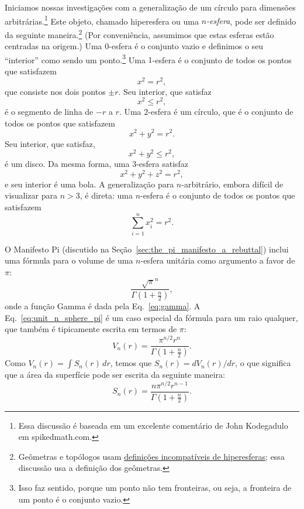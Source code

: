 Iniciamos nossas investigações com a generalização de um círculo para dimensões arbitrárias.\footnote{Essa discussão é baseada em um excelente comentário de John Kodegadulo em spikedmath.com.} Este objeto, chamado hiperesfera ou uma \emph{$n$-esfera}, pode ser definido da seguinte maneira.\footnote{Geômetras e topólogos usam \href{https://mathworld.wolfram.com/Hypersphere.html}{definições incompatíveis de hiperesferas}; essa discussão usa a definição dos geômetras.} (Por conveniência, assumimos que estas esferas estão centradas na origem.) Uma $0$-esfera é o conjunto vazio e definimos o seu ``interior'' como sendo um ponto.\footnote{Isso faz sentido, porque um ponto não tem fronteiras, ou seja, a fronteira de um ponto é o conjunto vazio.} Uma $1$-esfera é o conjunto de todos os pontos que satisfazem
\[
x^2 = r^2,
\]
que consiste nos dois pontos $\pm r$. Seu interior, que satisfaz
\[
x^2 \leq r^2,
\]
é o segmento de linha de $-r$ a $r$. Uma $2$-esfera é um círculo, que é o conjunto de todos os pontos que satisfazem
\[
x^2 + y^2 = r^2.
\]
Seu interior, que satisfaz,
\[
x^2 + y^2 \leq r^2,
\]
é um disco. Da mesma forma, uma $3$-esfera satisfaz
\[
x^2 + y^2 + z^2 = r^2,
\]
e seu interior é uma bola. A generalização para $n$-arbitrário, embora difícil de visualizar para $n > 3$, é direta: uma $n$-esfera é o conjunto de todos os pontos que satisfazem
\[
\sum_{i=1}^{n} x_i^2 = r^2.
\]

O Manifesto Pi (discutido na Seção~\ref{sec:the_pi_manifesto_a_rebuttal}) inclui uma fórmula para o volume de uma $n$-esfera unitária como argumento a favor de $\pi$:
\begin{equation}
\label{eq:unit_n_sphere_pi}
\frac{\sqrt{\pi}^{n} }{\Gamma(1 + \frac{n}{2})},
\end{equation}
onde a função Gamma é dada pela Eq.~\eqref{eq:gamma}. A Eq.~\eqref{eq:unit_n_sphere_pi} é um caso especial da fórmula para um raio qualquer, que também é tipicamente escrita em termos de $\pi$:
\begin{equation}
\label{eq:n_sphere_pi}
V_n(r) = \frac{\pi^{n/2} r^n}{\Gamma(1 + \frac{n}{2})}.
\end{equation}
Como $V_n(r) = \int S_n(r)\,dr$, temos que $S_n(r) = dV_n(r)/dr$, o que significa que a área da superfície pode ser escrita da seguinte maneira:
\begin{equation}
\label{eq:n_sphere_pi_r}
S_n(r) = \frac{n \pi^{n/2} r^{n-1}}{\Gamma(1 + \frac{n}{2})}.
\end{equation}

